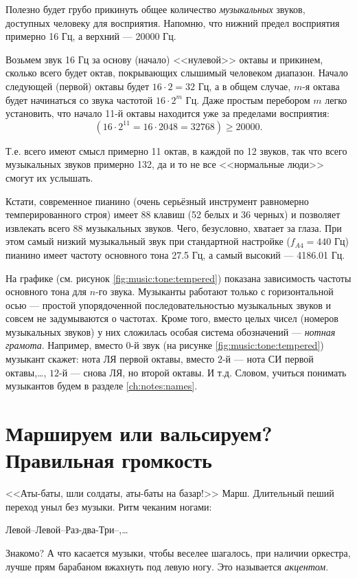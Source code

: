 \begin{Example}
    Полезно будет грубо прикинуть общее количество \emph{музыкальных} звуков, доступных человеку для восприятия. Напомню, что нижний предел восприятия примерно 16 Гц, а верхний --- 20000 Гц. 
    
    Возьмем звук 16 Гц за основу (начало) <<нулевой>> октавы и прикинем, сколько всего будет октав, покрывающих слышимый человеком диапазон. Начало следующей (первой) октавы будет $16\cdot 2 = 32$ Гц, а в общем случае, $m$-я октава будет начинаться со звука частотой $16\cdot 2^m$ Гц. Даже простым перебором $m$ легко установить, что начало 11-й октавы находится уже за пределами восприятия: 
    \[
        (16\cdot 2^{11} = 16\cdot 2048 = 32768) \ge 20000.
    \]
    
    Т.е. всего имеют смысл примерно 11 октав, в каждой по 12 звуков, так что всего музыкальных звуков примерно 132, да и то не все <<нормальные люди>> смогут их услышать. 
    
    Кстати, современное пианино (очень серьёзный инструмент равномерно темперированного строя) имеет 88 клавиш (52 белых и 36 черных) и позволяет извлекать всего 88 музыкальных звуков. Чего, безусловно, хватает за глаза. При этом самый низкий музыкальный звук при стандартной настройке ($f_{A4}=440$ Гц) пианино имеет частоту основного тона 27.5 Гц, а самый высокий --- 4186.01 Гц.
\end{Example}

На графике (см. рисунок \ref{fig:music:tone:tempered}) показана зависимость частоты основного тона для $n$-го звука. Музыканты работают только с горизонтальной осью --- простой упорядоченной последовательностью музыкальных звуков и совсем не задумываются о частотах. Кроме того, вместо целых чисел (номеров музыкальных звуков) у них сложилась особая система обозначений --- \emph{нотная грамота}. Например, вместо $0$-й звук (на рисунке \ref{fig:music:tone:tempered}) музыкант скажет: нота ЛЯ первой октавы, вместо $2$-й --- нота СИ первой октавы,\ldots, $12$-й --- снова ЛЯ, но второй октавы. И т.д. Словом, учиться понимать музыкантов будем в разделе \ref{ch:notes:names}.


\section{Маршируем или вальсируем? Правильная громкость}
\label{ch:music:volume}

<<Аты-баты, шли солдаты, аты-баты на базар!>> Марш. Длительный пеший переход уныл без музыки. Ритм чеканим ногами: 
\begin{center}
    Левой--Левой--Раз-два-Три--,\ldots 
\end{center}
Знакомо? А что касается музыки, чтобы веселее шагалось, при наличии оркестра, лучше прям барабаном вжахнуть под левую ногу. Это называется \emph{акцентом}. 

